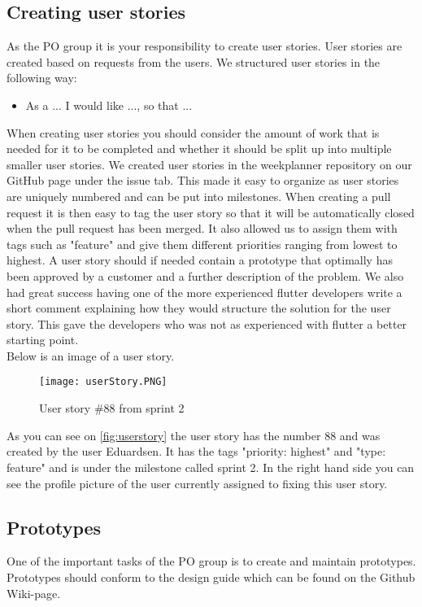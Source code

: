 \subsection{Creating user stories}
As the PO group it is your responsibility to create user stories.
User stories are created based on requests from the users.
We structured user stories in the following way:
\begin{itemize}
    \item As a ... I would like ..., so that ...
\end{itemize}

When creating user stories you should consider the amount of work that is needed for it to be completed and whether it should be split up into multiple smaller user stories.
We created user stories in the weekplanner repository on our GitHub page under the issue tab.
This made it easy to organize as user stories are uniquely numbered and can be put into milestones.
When creating a pull request it is then easy to tag the user story so that it will be automatically closed when the pull request has been merged.
It also allowed us to assign them with tags such as "feature" and give them different priorities ranging from lowest to highest.
A user story should if needed contain a prototype that optimally has been approved by a customer and a further description of the problem.
We also had great success having one of the more experienced flutter developers write a short comment explaining how they would structure the solution for the user story.
This gave the developers who was not as experienced with flutter a better starting point.
\\
Below is an image of a user story.
\begin{figure}[h]
    \centering
    \texttt{[image: userStory.PNG]}
    \caption{User story \#88 from sprint 2}
    \label{fig:userstory}
\end{figure}
As you can see on \autoref{fig:userstory} the user story has the number 88 and was created by the user Eduardsen.
It has the tags "priority: highest" and "type: feature" and is under the milestone called sprint 2.
In the right hand side you can see the profile picture of the user currently assigned to fixing this user story.

\subsection{Prototypes}
One of the important tasks of the PO group is to create and maintain prototypes.
Prototypes should conform to the design guide which can be found on the Github Wiki-page.




